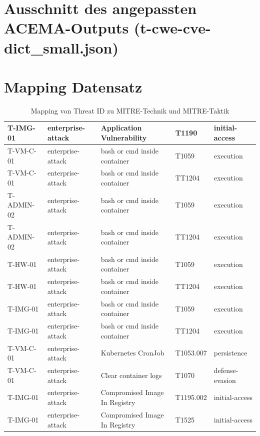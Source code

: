 \chapter{Ausschnitt des angepassten ACEMA-Outputs (t-cwe-cve-dict\_small.json)}

\restoregeometry

\chapter{Mapping Datensatz}
\label{app:mapping-dataset}
\begin{longtable}{|l|l|l|l|l|}
    \caption{Mapping von Threat ID zu MITRE-Technik und MITRE-Taktik}\\
    \hline
    T-IMG-01 & enterprise-attack & Application Vulnerability & T1190 & initial-access \\ \hline
    T-VM-C-01 & enterprise-attack & bash or cmd inside container & T1059 & execution \\ \hline
    T-VM-C-01 & enterprise-attack & bash or cmd inside container & TT1204 & execution \\ \hline
    T-ADMIN-02 & enterprise-attack & bash or cmd inside container & T1059 & execution \\ \hline
    T-ADMIN-02 & enterprise-attack & bash or cmd inside container & TT1204 & execution \\ \hline
    T-HW-01 & enterprise-attack & bash or cmd inside container & T1059 & execution \\ \hline
    T-HW-01 & enterprise-attack & bash or cmd inside container & TT1204 & execution \\ \hline
    T-IMG-01 & enterprise-attack & bash or cmd inside container & T1059 & execution \\ \hline
    T-IMG-01 & enterprise-attack & bash or cmd inside container & TT1204 & execution \\ \hline
    T-VM-C-01 & enterprise-attack & Kubernetes CronJob & T1053.007 & persistence \\ \hline
    T-VM-C-01 & enterprise-attack & Clear container logs & T1070 & defense-evasion \\ \hline
    T-IMG-01 & enterprise-attack & Compromised Image In Registry & T1195.002 & initial-access \\ \hline
    T-IMG-01 & enterprise-attack & Compromised Image In Registry & T1525 & initial-access \\ \hline

\end{longtable}

